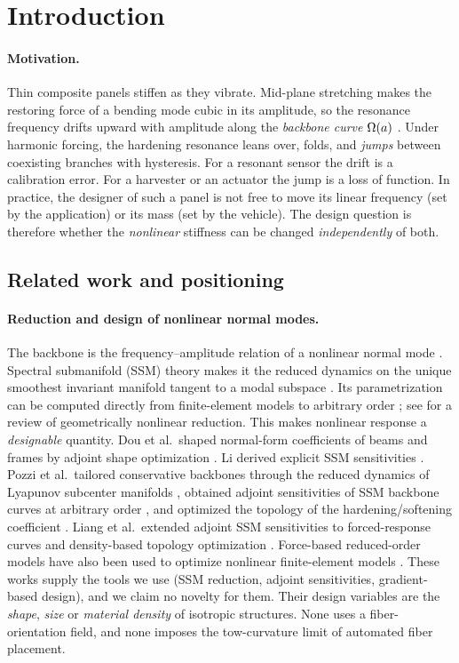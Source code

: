 \section{Introduction}\label{sec:intro}

\paragraph{Motivation.} Thin composite panels stiffen as they vibrate. Mid-plane
stretching makes the restoring force of a bending mode cubic in its amplitude, so the
resonance frequency drifts upward with amplitude along the \emph{backbone curve}
$\Omega(a)$ \cite{touze,shaw}. Under harmonic forcing, the hardening resonance leans over,
folds, and \emph{jumps} between coexisting branches with hysteresis. For a resonant
sensor the drift is a calibration error. For a harvester or an actuator the jump is a
loss of function. In practice, the designer of such a panel is not free to move its
linear frequency (set by the application) or its mass (set by the vehicle). The design
question is therefore whether the \emph{nonlinear} stiffness can be changed
\emph{independently} of both.

\subsection{Related work and positioning}\label{sec:related}
\paragraph{Reduction and design of nonlinear normal modes.} The backbone is the
frequency--amplitude relation of a nonlinear normal mode \cite{shaw,kerschen2009,nayfeh1979}.
Spectral submanifold (SSM) theory makes it the reduced dynamics on the unique smoothest
invariant manifold tangent to a modal subspace \cite{haller2016}. Its parametrization can
be computed directly from finite-element models to arbitrary order
\cite{ponsioen2018,jain2022,vizzaccaro2022,opreni2023}; see \cite{touze} for a review of
geometrically nonlinear reduction. This makes nonlinear response a \emph{designable}
quantity. Dou et al.\ shaped normal-form coefficients of beams and frames by adjoint
shape optimization \cite{dou2015,doujensen2016}. Li derived explicit SSM sensitivities
\cite{li2024}. Pozzi et al.\ tailored conservative backbones through the reduced dynamics of
Lyapunov subcenter manifolds \cite{pozzi2024lsm}, obtained adjoint sensitivities of SSM
backbone curves at arbitrary order \cite{pozzi2025}, and optimized the topology of the
hardening/softening coefficient \cite{pozzi2025smo}. Liang et al.\ extended adjoint SSM
sensitivities to forced-response curves and density-based topology optimization
\cite{liang2025}. Force-based reduced-order models have also been used to optimize
nonlinear finite-element models \cite{xiao2026}. These works supply the tools we use
(SSM reduction, adjoint sensitivities, gradient-based design), and we claim no novelty for
them. Their design variables are the \emph{shape}, \emph{size} or \emph{material density} of
isotropic structures. None uses a fiber-orientation field, and none imposes the tow-curvature
limit of automated fiber placement.

